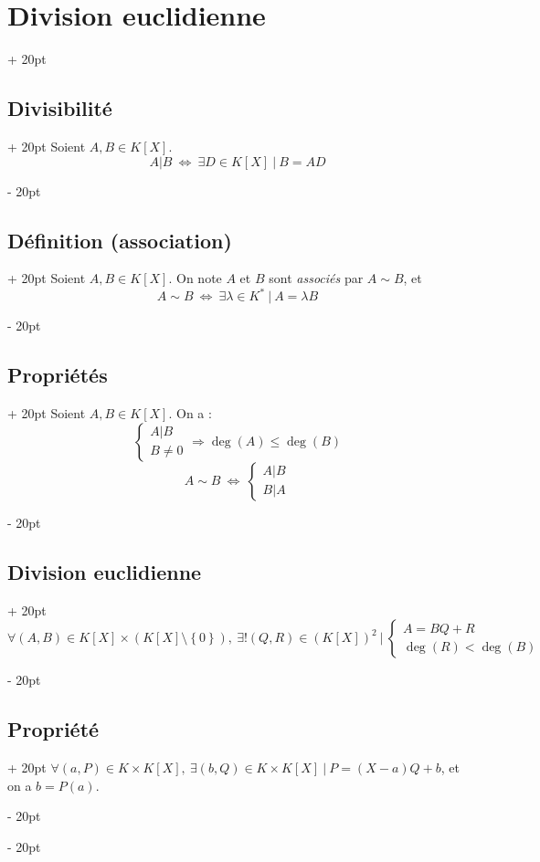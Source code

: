 \documentclass[a4paper, 12pt, twoside]{article}
\newcommand{\ssi}{\ \Leftrightarrow \ }
\newcommand{\eqsys}[2]{\begin{cases} #1 \\ #2 \end{cases}}
\newcommand{\set}[1]{\left\{ #1 \right\}}
\renewcommand{\le}{\leqslant}
\newcommand{\ind}[1][20pt]{\advance\leftskip + #1}
\newcommand{\deind}[1][20pt]{\advance\leftskip - #1}
\newenvironment{indt}[2][20pt]{#2 \par \ind[#1]}{\par \deind} %
\begin{document}
    \begin{indt}{\section{Division euclidienne}}
        
        \begin{indt}{\subsection{Divisibilité}}
            Soient $A, B \in K[X]$.
                \[ A|B \ssi \exists D \in K[X]\ |\ B = AD \]
        \end{indt}
        
        \vspace{6pt}
        
        \begin{indt}{\subsection{Définition (association)}}
            Soient $A, B \in K[X]$.
            On note $A$ et $B$ sont \textit{associés} par $A \sim B$, et 
                \[ A \sim B \ssi \exists \lambda \in K^* \ |\ A = \lambda B \]
        \end{indt}
        
        \vspace{6pt}
        
        \begin{indt}{\subsection{Propriétés}}
            Soient $A, B \in K[X]$. On a :
                \[ \eqsys{A|B}{B \neq 0} \Rightarrow \deg(A) \le \deg(B) \]
                \[ A \sim B \ssi \eqsys{A|B}{B|A} \]
        \end{indt}
        
        \vspace{6pt}
        
        \begin{indt}{\subsection{Division euclidienne}}
            $\forall (A, B) \in K[X] \times (K[X] \setminus \set 0),\ \exists! (Q, R) \in (K[X])^2\ |\ \eqsys{A = BQ + R}{\deg(R) < \deg(B)}$
        \end{indt}
        
        \vspace{6pt}
        
        \begin{indt}{\subsection{Propriété}}
            $\forall (a, P) \in K \times K[X],\ \exists (b, Q) \in K \times K[X]\ |\ P = (X - a)Q + b$, et on a $b = P(a)$.
        \end{indt}
        
    \end{indt}
    
\end{document}
